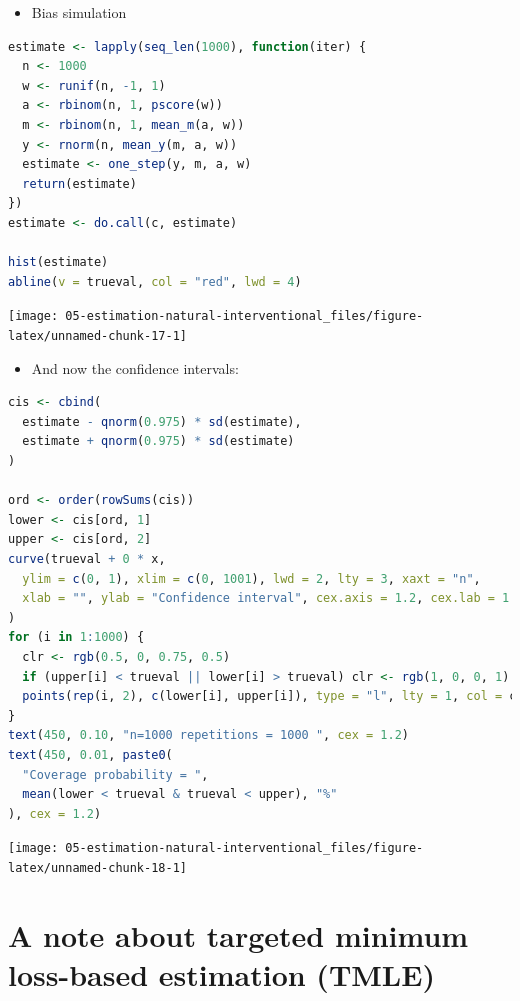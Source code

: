 \documentclass[
  12pt,
]{book}
\providecommand{\tightlist}{%
  \setlength{\itemsep}{0pt}\setlength{\parskip}{0pt}}
\theoremstyle{definition}
\theoremstyle{definition}
\theoremstyle{definition}
\newcommand{\1}{\mathbbm{1}}
\begin{document}
\begin{itemize}
\tightlist
\item
  Bias simulation
\end{itemize}

\begin{lstlisting}[language=R]
estimate <- lapply(seq_len(1000), function(iter) {
  n <- 1000
  w <- runif(n, -1, 1)
  a <- rbinom(n, 1, pscore(w))
  m <- rbinom(n, 1, mean_m(a, w))
  y <- rnorm(n, mean_y(m, a, w))
  estimate <- one_step(y, m, a, w)
  return(estimate)
})
estimate <- do.call(c, estimate)

hist(estimate)
abline(v = trueval, col = "red", lwd = 4)
\end{lstlisting}

\begin{center}\texttt{[image: 05-estimation-natural-interventional\_files/figure-latex/unnamed-chunk-17-1]} \end{center}

\begin{itemize}
\tightlist
\item
  And now the confidence intervals:
\end{itemize}

\begin{lstlisting}[language=R]
cis <- cbind(
  estimate - qnorm(0.975) * sd(estimate),
  estimate + qnorm(0.975) * sd(estimate)
)

ord <- order(rowSums(cis))
lower <- cis[ord, 1]
upper <- cis[ord, 2]
curve(trueval + 0 * x,
  ylim = c(0, 1), xlim = c(0, 1001), lwd = 2, lty = 3, xaxt = "n",
  xlab = "", ylab = "Confidence interval", cex.axis = 1.2, cex.lab = 1.2
)
for (i in 1:1000) {
  clr <- rgb(0.5, 0, 0.75, 0.5)
  if (upper[i] < trueval || lower[i] > trueval) clr <- rgb(1, 0, 0, 1)
  points(rep(i, 2), c(lower[i], upper[i]), type = "l", lty = 1, col = clr)
}
text(450, 0.10, "n=1000 repetitions = 1000 ", cex = 1.2)
text(450, 0.01, paste0(
  "Coverage probability = ",
  mean(lower < trueval & trueval < upper), "%"
), cex = 1.2)
\end{lstlisting}

\begin{center}\texttt{[image: 05-estimation-natural-interventional\_files/figure-latex/unnamed-chunk-18-1]} \end{center}

\hypertarget{a-note-about-targeted-minimum-loss-based-estimation-tmle}{%
\section{A note about targeted minimum loss-based estimation (TMLE)}\label{a-note-about-targeted-minimum-loss-based-estimation-tmle}}
\end{document}
